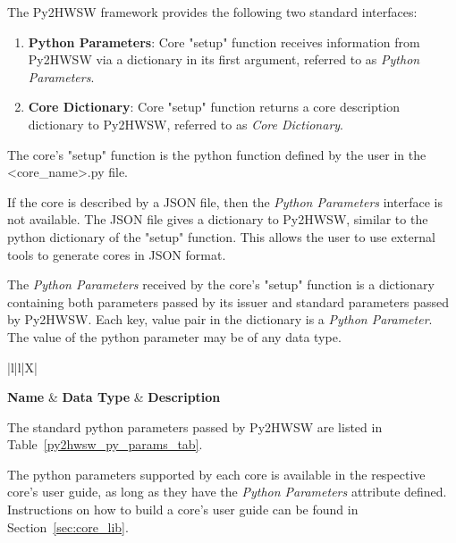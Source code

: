 %

The Py2HWSW framework provides the following two standard interfaces:
\begin{enumerate}
  \item \textbf{Python Parameters}: Core "setup" function receives information from Py2HWSW via a dictionary in its first argument, referred to as \textit{Python Parameters}.
  \item \textbf{Core Dictionary}: Core "setup" function returns a core description dictionary to Py2HWSW, referred to as \textit{Core Dictionary}.
\end{enumerate}

The core's "setup" function is the python function defined by the user in the <core\_name>.py file.

If the core is described by a JSON file, then the \textit{Python Parameters} interface is not available.
The JSON file gives a dictionary to Py2HWSW, similar to the python dictionary of the "setup" function.
This allows the user to use external tools to generate cores in JSON format.

%
%

The \textit{Python Parameters} received by the core's "setup" function is a dictionary containing both parameters passed by its issuer and standard parameters passed by Py2HWSW.
Each key, value pair in the dictionary is a \textit{Python Parameter}.
The value of the python parameter may be of any data type.

{
\setlength{\LTcapwidth}{\linewidth} %
\begin{xltabular}{\textwidth}{|l|l|X|}

  \hline
  {\bf Name} & {\bf Data Type} & {\bf Description}  \\ \hline \hline
  \endfirsthead
  \hline
  \caption{Standard \textit{Python Parameters} passed by Py2HWSW to every core's "setup" function.}
  \endlastfoot

  

  \label{py2hwsw_py_params_tab}
\end{xltabular}
}

The standard python parameters passed by Py2HWSW are listed in Table~\ref{py2hwsw_py_params_tab}.

The python parameters supported by each core is available in the respective core's user guide, as long as they have the \textit{Python Parameters} attribute defined.
Instructions on how to build a core's user guide can be found in Section~\ref{sec:core_lib}. 


